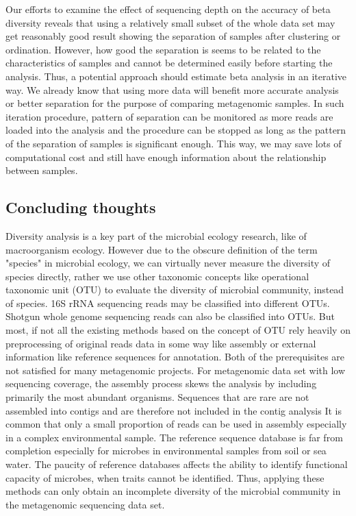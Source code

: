 \documentclass{article}
\begin{document}
Our efforts to examine the effect of sequencing depth on the accuracy of beta
diversity reveals that using a relatively small subset of the whole data set may
get reasonably good result showing the separation of samples after clustering
or ordination. However, how good the separation is seems to be related to the
characteristics of samples and cannot be determined easily before starting the
analysis. Thus, a potential approach should estimate beta analysis in an iterative
way. We already know that using more data will benefit more accurate analysis or better
separation for the purpose of comparing metagenomic samples. In such
iteration procedure, pattern of separation can be monitored as more reads
are loaded into the analysis and the procedure can be stopped as long as the
pattern of the separation of samples is significant enough. This way, we may
save lots of computational cost and still have enough information about the
relationship between samples. 
 
    

\subsection{Concluding thoughts}


Diversity analysis is a key part of the microbial ecology research, like of
macroorganism ecology. However due to the obscure definition of the term
"species" in microbial ecology, we can virtually never measure the diversity of
species directly, rather we use other taxonomic concepts like operational
taxonomic unit (OTU) to evaluate the diversity of microbial community, instead
of species. 16S rRNA sequencing reads may be classified into different OTUs.
Shotgun whole genome sequencing reads can also be classified into OTUs. But
most, if not all the existing methods based on the concept of OTU rely heavily on  
preprocessing of original reads data in some way like assembly or external 
information like reference sequences for annotation. Both of the prerequisites
are not satisfied for many metagenomic projects. For metagenomic data set with
low sequencing coverage, the assembly process skews the analysis by including 
primarily the most abundant organisms. Sequences that are rare are not 
assembled into contigs and are therefore not included in the contig analysis
It is common that only a small proportion of
reads can be used in assembly especially in a complex environmental sample. 
\cite{Howe2012} The reference sequence database is far from
completion especially for microbes in environmental samples from soil or sea water.
The paucity of reference databases affects the ability to identify functional 
capacity of microbes, when traits cannot be identified. 
Thus, applying these methods can only obtain an incomplete diversity of
the microbial community in the metagenomic sequencing data set. 
\end{document}
